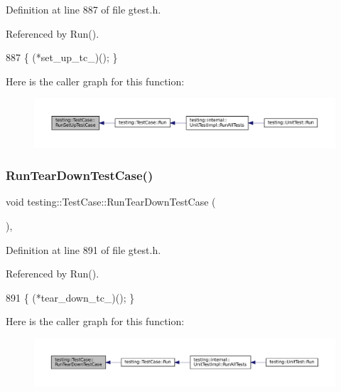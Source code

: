 Definition at line 887 of file gtest.\+h.



Referenced by Run().


\begin{DoxyCode}
887 \{ (*set\_up\_tc\_)(); \}
\end{DoxyCode}
Here is the caller graph for this function\+:
\nopagebreak
\begin{figure}[H]
\begin{center}
\leavevmode
\includegraphics[width=350pt]{classtesting_1_1TestCase_a10763d318d617f921803741ec81919c5_icgraph}
\end{center}
\end{figure}
\mbox{\label{classtesting_1_1TestCase_a23563c9cbbd004159c6acef2af0e7c39}} 
\subsubsection{\texorpdfstring{Run\+Tear\+Down\+Test\+Case()}{RunTearDownTestCase()}}
{\footnotesize\ttfamily void testing\+::\+Test\+Case\+::\+Run\+Tear\+Down\+Test\+Case (\begin{DoxyParamCaption}{ }\end{DoxyParamCaption})\hspace{0.3cm}{\ttfamily [inline]}, {\ttfamily [private]}}



Definition at line 891 of file gtest.\+h.



Referenced by Run().


\begin{DoxyCode}
891 \{ (*tear\_down\_tc\_)(); \}
\end{DoxyCode}
Here is the caller graph for this function\+:
\nopagebreak
\begin{figure}[H]
\begin{center}
\leavevmode
\includegraphics[width=350pt]{classtesting_1_1TestCase_a23563c9cbbd004159c6acef2af0e7c39_icgraph}
\end{center}
\end{figure}
\mbox{\label{classtesting_1_1TestCase_a58ecf00d6682b83caef887682b6012f0}} 
